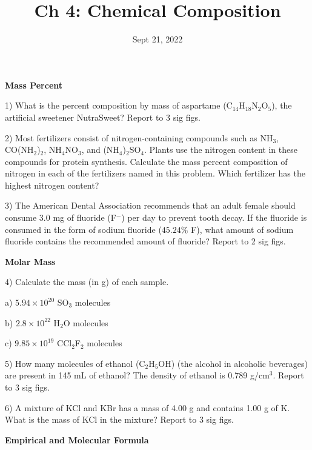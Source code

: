 \documentclass[12pt]{article}
\title{\textbf{Ch 4: Chemical Composition}}
\date{Sept 21, 2022}
\begin{document}
\maketitle 

\textbf{Mass Percent}

1) What is the percent composition by mass of aspartame (C$_{14}$H$_{18}$N$_2$O$_5$),
the artificial sweetener NutraSweet? Report to 3 sig figs.

\vspace{0.5in}

2) Most fertilizers consist of nitrogen-containing compounds such as NH$_3$, CO(NH$_2$)$_2$,
NH$_4$NO$_3$, and (NH$_4$)$_2$SO$_4$. Plants use the nitrogen content in these compounds
for protein synthesis. Calculate the mass percent composition of nitrogen in each of the
fertilizers named in this problem. Which fertilizer has the highest nitrogen content?

\vspace{0.5in}

3) The American Dental Association recommends that an adult female should consume 3.0 mg
of fluoride (F$^-$) per day to prevent tooth decay. If the fluoride is consumed in the form
of sodium fluoride ($45.24\%$ F), what amount of sodium fluoride contains the recommended
amount of fluoride? Report to 2 sig figs.

\vspace{0.5in}


\textbf{Molar Mass}

4) Calculate the mass (in g) of each sample.

a) $5.94 \times 10^{20}$ SO$_3$ molecules

b) $2.8 \times 10^{22}$ H$_2$O molecules

c) $9.85 \times 10^{19}$ CCl$_2$F$_2$ molecules

\vspace{0.5in}

5) How many molecules of ethanol (C$_2$H$_5$OH) (the alcohol in alcoholic beverages) are present
in 145 mL of ethanol? The density of ethanol is 0.789 g/cm$^3$. Report to 3 sig figs.

\vspace{0.5in}

6) A mixture of KCl and KBr has a mass of 4.00 g and contains 1.00 g of K. What is the
mass of KCl in the mixture? Report to 3 sig figs.

\vspace{0.5in}

\textbf{Empirical and Molecular Formula}
\end{document}
